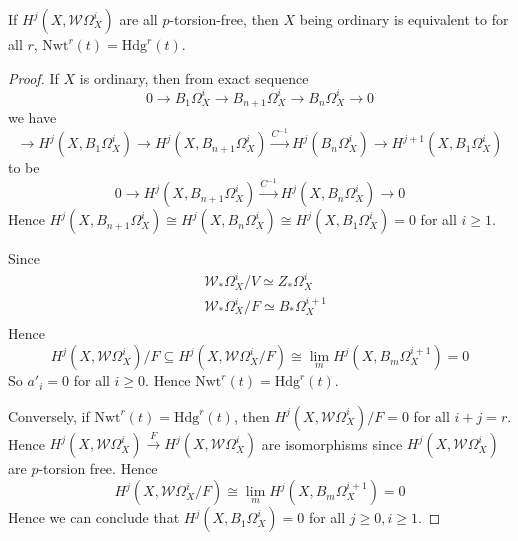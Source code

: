 \begin{seccor}
	If $H^j(X, \mathcal{W}\Omega_X^i)$ are all $p$-torsion-free, then $X$ being ordinary is equivalent to  for all $r$, $\text{Nwt}^r(t) = \text{Hdg}^r(t)$.
\end{seccor}
\begin{proof}
	If $X$ is ordinary, then from exact sequence
	\[
	0 \to B_1 \Omega_X^i \to B_{n+1} \Omega_X^i \to B_n \Omega_X^i \to 0
	\]
	we have 
	\[
	 \to H^j(X, B_1 \Omega_X^i) \to H^j(X, B_{n+1} \Omega_X^i) \xrightarrow{C^{-1}} H^j(B_n \Omega_X^i) \to H^{j+1}(X, B_1 \Omega_X^i)
	\]
	to be 
	\[
	0 \to H^j(X, B_{n+1}\Omega_X^i) \xrightarrow{C^{-1}} H^j(X, B_n \Omega_X^i) \to 0
	\]
	Hence $H^{j}(X, B_{n+1} \Omega_X^i) \cong H^j(X, B_n \Omega_X^i) \cong H^j(X, B_1 \Omega_X^i) =0$ for all $i \geq 1$.
	
	Since 
	\[
	\begin{aligned}
	&\mathcal{W}_* \Omega_X^i /V \simeq Z_* \Omega_X^i\\
	&\mathcal{W}_* \Omega_X^i / F \simeq B_* \Omega_X^{i+1}\\
	\end{aligned}
	\]
	Hence
	\[
	H^j(X, \mathcal{W}\Omega_X^i)/F \subseteq H^j(X, \mathcal{W}\Omega_X^i /F) \cong \lim_m H^j(X, B_m \Omega_X^{i+1}) =0
	\]
	So $a'_i =0 $ for all $i \geq 0$. Hence $\text{Nwt}^r(t) = \text{Hdg}^r(t)$.
	
	Conversely, if $\text{Nwt}^r(t) = \text{Hdg}^r(t)$, then $H^j(X,\mathcal{W}\Omega_X^i)/F =0$ for all $i+j=r$. Hence 
	$H^j(X,\mathcal{W}\Omega_X^i) \xrightarrow{F} H^j(X,\mathcal{W}\Omega_X^i)$ are isomorphisms since $H^j(X,\mathcal{W}\Omega_X^i)$ are $p$-torsion free. Hence 
	\[
	H^j (X,\mathcal{W}\Omega_X^i /F) \cong \lim_m H^j(X, B_m \Omega_X^{i+1}) =0
	\] 
	Hence we can conclude that $H^j(X, B_1 \Omega_X^i)=0$ for all $j 
	\geq 0, i \geq 1$.
\end{proof}